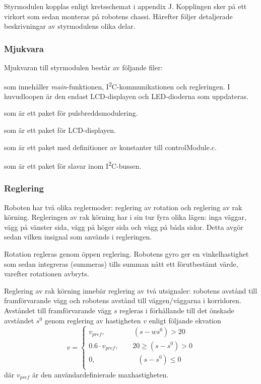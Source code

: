 \documentclass[11pt]{article}
\begin{document}
\begin{flushleft}
Styrmodulen kopplas enligt kretsschemat i appendix J. Kopplingen sker på ett virkort som sedan monteras på robotens chassi. Härefter följer detaljerade beskrivningar av styrmodulens olika delar.

\subsubsection{Mjukvara}
Mjukvaran till styrmodulen består av följande filer:
\begin{description}[style=unboxed, leftmargin=0cm]
  \item[controlModule.c] som innehåller \textit{main}-funktionen, I\textsuperscript{2}C-kommunikationen och regleringen. I huvudloopen är den endast LCD-displayen och LED-dioderna som uppdateras.
  \item[PWM.h] som är ett paket för pulsbreddsmodulering.
  \item[LCD.h] som är ett paket för LCD-displayen.
  \item[constants.h] som är ett paket med definitioner av konstanter till controlModule.c.
  \item[I2C\_slave.h] som är ett paket för slavar inom I\textsuperscript{2}C-bussen.

\end{description}

\subsubsection{Reglering}
Roboten har två olika reglermoder: reglering av rotation och reglering av rak körning. Regleringen av rak körning har i sin tur fyra olika lägen: inga väggar, vägg på vänster sida, vägg på höger sida och vägg på båda sidor. Detta avgör sedan vilken insignal som används i regleringen.

Rotation regleras genom öppen reglering. Robotens gyro ger en vinkelhastighet som sedan integreras (summeras) tills summan nått ett förutbestämt värde, varefter rotationen avbryts.

Reglering av rak körning innebär reglering av två utsignaler: robotens avstånd till framförvarande vägg och robotens avstånd till väggen/väggarna i korridoren. Avståndet till framförvarande vägg $s$ regleras i förhållande till det önskade avståndet $s^0$ genom reglering av hastigheten $v$ enligt följande ekvation
\begin{equation*}
	v = 
	\begin{cases}
		v_{pref}, \qquad\qquad (s -w s^0) > 20 \\
		0.6 \cdot v_{pref}, \qquad 20 \geq (s - s^0) > 0 \\
		0, \qquad\qquad\qquad (s - s^0)\leq 0 \\
	\end{cases}
\end{equation*}
där $v_{pref}$ är den användardefinierade maxhastigheten.


\end{flushleft}
\end{document}

